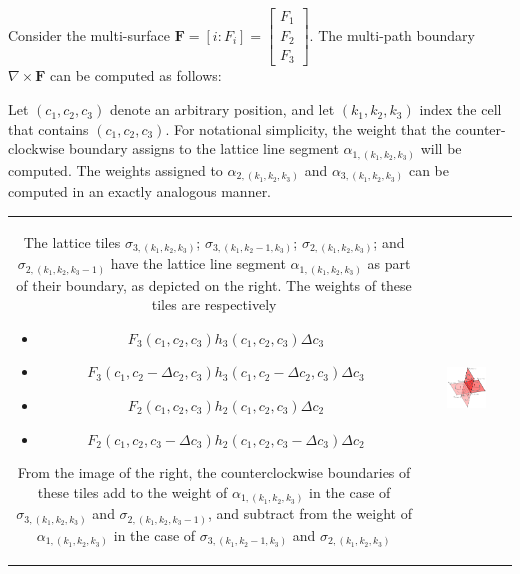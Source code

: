 \documentclass{book}
\begin{document}
Consider the multi-surface \(\mathbf{F} = [i : F_i] = \begin{bmatrix} F_1 \\ F_2 \\ F_3 \end{bmatrix}\). The multi-path boundary \(\nabla \times \mathbf{F}\) can be computed as follows:

Let \((c_1, c_2, c_3)\) denote an arbitrary position, and let \((k_1, k_2, k_3)\) index the cell that contains \((c_1, c_2, c_3)\). For notational simplicity, the weight that the counter-clockwise boundary assigns to the lattice line segment \(\alpha_{1, (k_1, k_2, k_3)}\) will be computed. The weights assigned to \(\alpha_{2, (k_1, k_2, k_3)}\) and \(\alpha_{3, (k_1, k_2, k_3)}\) can be computed in an exactly analogous manner. 

\begin{tabular}{cc}
\parbox{0.5\textwidth}{
The lattice tiles \(\sigma_{3, (k_1, k_2, k_3)}\); \(\sigma_{3, (k_1, k_2-1, k_3)}\); \(\sigma_{2, (k_1, k_2, k_3)}\); and \(\sigma_{2, (k_1, k_2, k_3-1)}\) have the lattice line segment \(\alpha_{1, (k_1, k_2, k_3)}\) as part of their boundary, as depicted on the right. The weights of these tiles are respectively 
\begin{itemize}
\item \(F_3(c_1,c_2,c_3)h_3(c_1,c_2,c_3)\Delta c_3\) 
\item \(F_3(c_1,c_2 - \Delta c_2,c_3)h_3(c_1,c_2 - \Delta c_2,c_3)\Delta c_3\) 
\item \(F_2(c_1,c_2,c_3)h_2(c_1,c_2,c_3)\Delta c_2\)
\item \(F_2(c_1,c_2,c_3 - \Delta c_3)h_2(c_1,c_2,c_3 - \Delta c_3)\Delta c_2\)   
\end{itemize}    
From the image of the right, the counterclockwise boundaries of these tiles add to the weight of \(\alpha_{1, (k_1, k_2, k_3)}\) in the case of \(\sigma_{3, (k_1, k_2, k_3)}\) and \(\sigma_{2, (k_1, k_2, k_3-1)}\), and subtract from the weight of \(\alpha_{1, (k_1, k_2, k_3)}\) in the case of \(\sigma_{3, (k_1, k_2-1, k_3)}\) and \(\sigma_{2, (k_1, k_2, k_3)}\)
} & \parbox{0.5\textwidth}{
\includegraphics[width = 0.5\textwidth]{Coordinate_systems/surface_boundary_cell}
}
\end{tabular}
\end{document}
